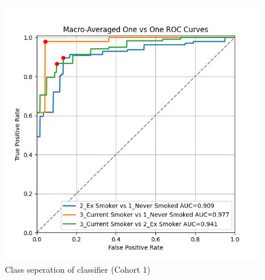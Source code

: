 \documentclass{article}
\begin{document}
\begin{figure}
    \centering
    \includegraphics[width=\linewidth]{cohort1_macro_ovo_roc.png}
    \caption{Class seperation of classifier (Cohort 1)}
\end{figure}
\end{document}
